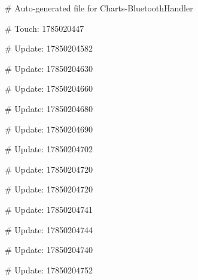 # Auto-generated file for Charts-BluetoothHandler

# Touch: 1785020447

# Update: 17850204582

# Update: 17850204630

# Update: 17850204660

# Update: 17850204680

# Update: 17850204690

# Update: 17850204702

# Update: 17850204720

# Update: 17850204720

# Update: 17850204741

# Update: 17850204744

# Update: 17850204740

# Update: 17850204752

